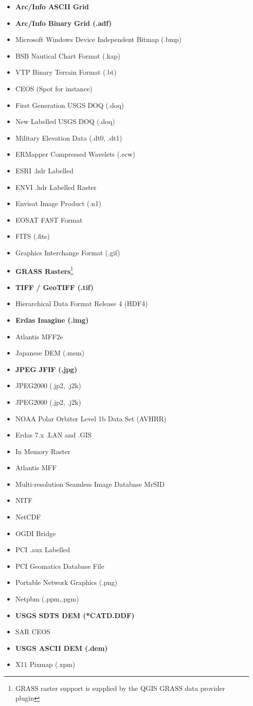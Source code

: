 \begin{itemize}
\item \textbf{Arc/Info ASCII Grid}
\item \textbf{Arc/Info Binary Grid (.adf)}
\item Microsoft Windows Device Independent Bitmap (.bmp)
\item BSB Nautical Chart Format (.kap)
\item VTP Binary Terrain Format (.bt)
\item CEOS (Spot for instance)
\item First Generation USGS DOQ (.doq)
\item New Labelled USGS DOQ (.doq)
\item Military Elevation Data (.dt0, .dt1)
\item ERMapper Compressed Wavelets (.ecw)
\item ESRI .hdr Labelled
\item ENVI .hdr Labelled Raster
\item Envisat Image Product (.n1)
\item EOSAT FAST Format
\item FITS (.fits)
\item Graphics Interchange Format (.gif)
\item \textbf{GRASS Rasters}\footnote{GRASS raster support is supplied by the
QGIS GRASS data provider plugin} 
\item \textbf{TIFF / GeoTIFF (.tif)}
\item Hierarchical Data Format Release 4 (HDF4)
\item \textbf{Erdas Imagine (.img)}
\item Atlantis MFF2e
\item Japanese DEM (.mem)
\item \textbf{JPEG JFIF (.jpg)}
\item JPEG2000 (.jp2, .j2k)
\item JPEG2000 (.jp2, .j2k)
\item NOAA Polar Orbiter Level 1b Data Set (AVHRR)
\item Erdas 7.x .LAN and .GIS
\item In Memory Raster
\item Atlantis MFF
\item Multi-resolution Seamless Image Database  MrSID
\item NITF
\item NetCDF
\item OGDI Bridge
\item PCI .aux Labelled
\item PCI Geomatics Database File
\item Portable Network Graphics (.png)
\item Netpbm (.ppm,.pgm)
\item \textbf{USGS SDTS DEM (*CATD.DDF)}
\item SAR CEOS
\item \textbf{USGS ASCII DEM (.dem)}
\item X11 Pixmap (.xpm)

\end{itemize}
\clearpage
